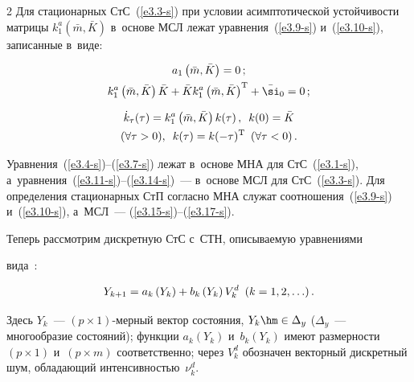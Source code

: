 \begin{multicols}{2}
Для стационарных СтС~(\ref{e3.3-s}) при условии асимптотической устойчивости матрицы $k_1^a (\bar m, \bar K)$ в~основе МСЛ лежат уравнения~(\ref{e3.9-s}) и~(\ref{e3.10-s}), записанные в~виде:

    \begin{gather}

    a_1 \left(\bar m, \bar K\right) =0\,; \label{e3.15-s}\\

   k_1^a \left(\bar m, \bar K\right) \bar K + \bar K k_1^a \left(\bar m, \bar K\right)^{\mathrm{T}} +\bar \si_0 =0\,;\label{e3.16-s}

   \end{gather}



   \vspace*{-12pt}



   \noindent

   \begin{multline}

   \dot k_\tau (\tau) = k_1^a \left(\bar m, \bar K\right)k(\tau)\,,\enskip k(0) =\bar K \\ (\forall \tau >0),\enskip k(\tau) = k (-\tau)^{\mathrm{T}} \enskip (\forall \tau <0)\,.\label{e3.17-s}

   \end{multline}



Уравнения~(\ref{e3.4-s})--(\ref{e3.7-s}) лежат в~основе МНА для СтС~(\ref{e3.1-s}), а~урав\-не\-ния~(\ref{e3.11-s})--(\ref{e3.14-s})~--- в~основе МСЛ для СтС~(\ref{e3.3-s}). Для определения стационарных СтП согласно МНА служат соотношения~(\ref{e3.9-s}) и~(\ref{e3.10-s}), а~МСЛ~--- (\ref{e3.15-s})--(\ref{e3.17-s}).



Теперь рассмотрим дискретную СтС с~СТН, описываемую уравнениями

вида~\cite{4-s, 10-s}:

    \begin{equation}

    Y_{k+1} = a_k \left(Y_k\right) + b_k \left(Y_k\right) V_k^d \enskip (k=1,2,\ldots)\,.\label{e3.18-s}

    \end{equation}

Здесь $Y_k$~--- $(p\times 1)$-мер\-ный вектор состояния, $Y_k\hm\in \Delta_y$ ($\Delta_y$~--- многообразие состояний); функции $a_k (Y_k)$ и~$b_k (Y_k)$ имеют размерности $(p\times 1)$ и~$(p\times m)$ соответственно; через $V_k^d$ обозначен векторный дискретный шум, обладающий интенсивностью~$\nu_k^d$.


\end{multicols}
